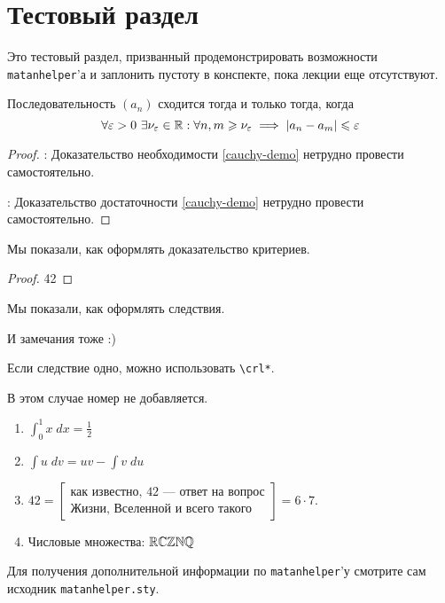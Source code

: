 \documentclass[../../main.tex]{subfiles}
\begin{document}
\section{Тестовый раздел}

Это тестовый раздел, призванный продемонстрировать возможности 
\texttt{matanhelper}'а и заплонить пустоту в конспекте, пока лекции еще 
отсутствуют.

\begin{thm} Последовательность $(a_n)$ сходится тогда и только 
тогда, когда
\begin{equation}
\forall \varepsilon > 0 \ \exists \nu_\varepsilon \in \mathbb{R} : \forall n, m \geqslant \nu_\varepsilon 
\implies \left|{a_n - a_m}\right| \leqslant \varepsilon
\label{cauchy-demo}
\end{equation}
\end{thm}
\begin{proof}
 \;

 \nec: Доказательство необходимости \eqref{cauchy-demo} нетрудно провести 
 самостоятельно.
 
 \suff: Доказательство достаточности \eqref{cauchy-demo} нетрудно провести 
 самостоятельно.
\end{proof}

\begin{crl}
 Мы показали, как оформлять доказательство критериев.
\end{crl}

\begin{proof}
 42
\end{proof}

\begin{crl}
 Мы показали, как оформлять следствия.
\end{crl}

\begin{rem}
 И замечания тоже :)
\end{rem}

\begin{thm}
 Если следствие одно, можно использовать \texttt{\textbackslash crl*}.
\end{thm}

\begin{crl*}
 В этом случае номер не добавляется.
\end{crl*}

\begin{exmps}
\begin{enumerate}
 \;

 \item $\displaystyle \int_0^1 x\;dx = \frac12$
 
 \item $\displaystyle \int u\;dv = uv - \int v\;du$
 
 \item $42 = \left[\begin{array}{c}\text{как известно, $42$~--- ответ на 
 вопрос} \\ \text{Жизни, Вселенной и всего такого}\end{array}\right] = 6\cdot 
 7$.
 
 \item Числовые множества: $\mathbb{R} \mathbb{C} \mathbb{Z} \mathbb{N} \mathbb{Q}$
\end{enumerate}
\end{exmps}

\begin{lem}
 Для получения дополнительной информации по \texttt{matanhelper}'у смотрите 
 сам исходник \texttt{matanhelper.sty}.
\end{lem}
\end{document}

